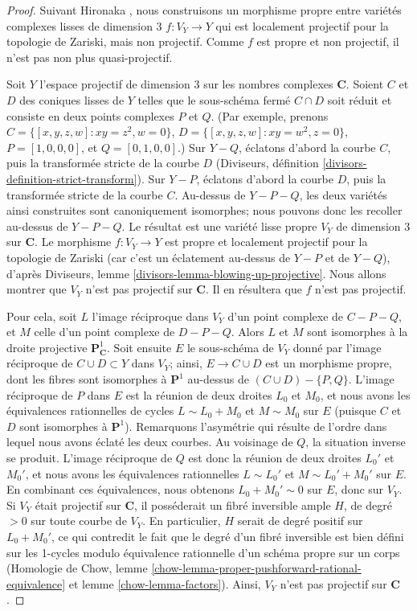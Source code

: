 \begin{proof}
Suivant Hironaka \cite[exemple B.3.4.1]{H},
nous construisons un morphisme propre entre variétés complexes lisses de dimension 3
$f:V_Y\to Y$
qui est localement projectif pour la topologie de Zariski, mais non projectif. Comme $f$ est propre
et non projectif, il n'est pas non plus quasi-projectif.

\medskip\noindent
Soit $Y$ l'espace projectif de dimension 3 sur les nombres complexes ${\mathbf C}$.
Soient $C$ et $D$ des coniques lisses de $Y$ telles
que le sous-schéma fermé $C\cap D$ soit réduit et consiste
en deux points complexes $P$ et $Q$. (Par exemple,
prenons $C=\{ [x,y,z,w]: xy=z^2, w=0\}$, $D=\{ [x,y,z,w]:
xy=w^2, z=0\}$, $P=[1,0,0,0]$,
et $Q=[0,1,0,0]$.)
Sur $Y-Q$, éclatons d'abord la courbe $C$, puis la
transformée stricte de la courbe $D$ (Diviseurs, définition
\ref{divisors-definition-strict-transform}). Sur $Y-P$, éclatons d'abord
la courbe $D$, puis la transformée stricte de la courbe
$C$. Au-dessus de $Y-P-Q$, les deux variétés ainsi construites sont canoniquement
isomorphes; nous pouvons donc les recoller au-dessus de $Y-P-Q$. Le résultat
est une variété lisse propre $V_Y$ de dimension 3 sur ${\mathbf C}$. Le morphisme
$f:V_Y\to Y$ est propre et localement projectif pour la topologie de Zariski (car
c'est un éclatement au-dessus de $Y-P$ et de $Y-Q$), d'après Diviseurs,
lemme \ref{divisors-lemma-blowing-up-projective}. Nous allons montrer que
$V_Y$ n'est pas projectif sur ${\mathbf C}$. Il en résultera que
$f$ n'est pas projectif.

\medskip\noindent
Pour cela, soit $L$ l'image réciproque dans $V_Y$ d'un point complexe
de $C-P-Q$, et $M$ celle d'un point complexe de $D-P-Q$.
Alors $L$ et $M$ sont isomorphes à la droite projective
${\mathbf P}^1_{{\mathbf C}}$.
Soit ensuite $E$ le sous-schéma de $V_Y$ donné par l'image réciproque de $C\cup D\subset Y$ dans $V_Y$;
ainsi, $E\rightarrow C\cup D$ est un morphisme propre, dont les fibres
sont isomorphes à ${\mathbf P}^1$ au-dessus de $(C\cup D)-\{P,Q\}$.
L'image
réciproque de $P$ dans $E$ est la réunion de deux droites $L_0$ et $M_0$, et nous avons
les équivalences rationnelles de cycles $L\sim L_0+M_0$ et $M\sim M_0$ sur $E$
(puisque $C$ et $D$ sont isomorphes à ${\mathbf P}^1$).
Remarquons l'asymétrie qui résulte de l'ordre dans lequel nous avons éclaté
les deux courbes. Au voisinage de $Q$, la situation inverse se produit. L'image réciproque
de $Q$ est donc la réunion de deux droites $L_0'$ et $M_0'$, et nous avons
les équivalences rationnelles $L\sim L_0'$ et $M\sim L_0'+M_0'$ sur $E$.
En combinant ces équivalences, nous obtenons $L_0+M_0'\sim 0$
sur $E$, donc sur $V_Y$. Si $V_Y$ était projectif sur ${\mathbf C}$,
il posséderait
un fibré inversible ample $H$, de degré $> 0$ sur toute courbe
de $V_Y$. En particulier, $H$ serait de degré positif sur $L_0+M_0'$,
ce qui contredit le fait que le degré d'un fibré inversible est bien défini
sur les 1-cycles modulo équivalence rationnelle d'un schéma propre
sur un corps (Homologie de Chow,
lemme \ref{chow-lemma-proper-pushforward-rational-equivalence}
et lemme \ref{chow-lemma-factors}).
Ainsi, $V_Y$ n'est pas projectif sur ${\mathbf C}$.
\end{proof}

